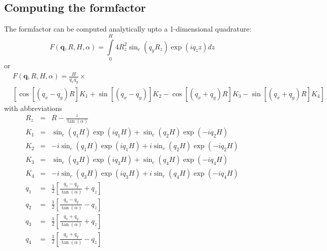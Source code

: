 \subsection{Computing the formfactor}
The formfactor can be computed analytically upto a 1-dimensional quadrature:
\begin{equation}
F(\mathbf q, R, H,\alpha) = \int\limits_{0}^{H}{4R_z^2\sin_c(q_yR_z)\exp(iq_zz)dz} 
\label{eq:ffpyramid}
\end{equation}
or
\begin{equation}
\begin{aligned}
 & F(\mathbf q, R, H,\alpha) = \frac{H}{q_xq_y}\times \\  
 & \left[ \cos[(q_x-q_y)R]K_1 + \sin[(q_x-q_y)]K_2 - \cos[(q_x+q_y)R]K_3 - \sin[(q_x+q_y)R]K_4 \right] 
\end{aligned}
\end{equation}
with abbreviations
\begin{eqnarray}
R_z &=& R - \frac{z}{\tan(\alpha)} \\
K_1 &=& \sin_c(q_1H)\exp(iq_1H) + \sin_c(q_2H)\exp(-iq_2H) \\ 
K_2 &=& -i\sin_c(q_1H)\exp(iq_1H) + i\sin_c(q_2H)\exp(-iq_2H) \\ 
K_3 &=& \sin_c(q_3H)\exp(iq_3H) + \sin_c(q_4H)\exp(-iq_4H) \\ 
K_4 &=& -i\sin_c(q_3H)\exp(iq_3H) + i\sin_c(q_4H)\exp(-iq_4H) \\
q_1 &=& \frac{1}{2}\left[\frac{q_x-q_y}{\tan(\alpha)} + q_z\right] \\ 
q_2 &=& \frac{1}{2}\left[\frac{q_x-q_y}{\tan(\alpha)} - q_z\right] \\
q_3 &=& \frac{1}{2}\left[\frac{q_x+q_y}{\tan(\alpha)} + q_z\right] \\
q_4 &=& \frac{1}{2}\left[\frac{q_x+q_y}{\tan(\alpha)} - q_z\right] 
\end{eqnarray}

